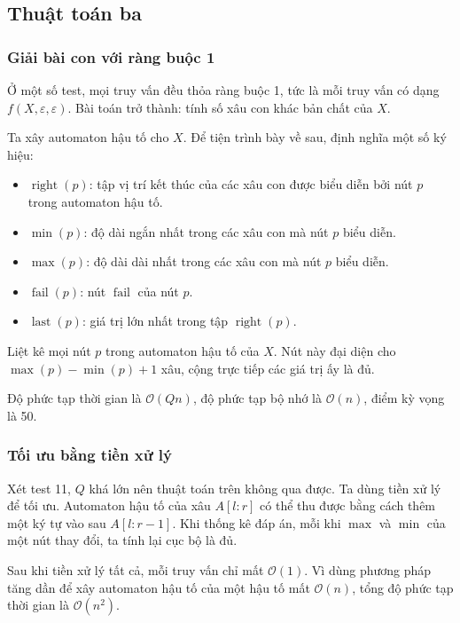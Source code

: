 \documentclass[11pt]{article}
\newcommand{\Oh}{\mathcal{O}}
\begin{document}
\subsection{Thuật toán ba}

\subsubsection{Giải bài con với ràng buộc 1}

Ở một số test, mọi truy vấn đều thỏa ràng buộc 1, tức là mỗi truy vấn có dạng
\(f(X,\varepsilon,\varepsilon)\). Bài toán trở thành: tính số xâu con khác bản
chất của \(X\).

Ta xây automaton hậu tố cho \(X\). Để tiện trình bày về sau, định nghĩa một số
ký hiệu:
\begin{itemize}
  \item \(\operatorname{right}(p)\): tập vị trí kết thúc của các xâu con được
  biểu diễn bởi nút \(p\) trong automaton hậu tố.
  \item \(\min(p)\): độ dài ngắn nhất trong các xâu con mà nút \(p\) biểu diễn.
  \item \(\max(p)\): độ dài dài nhất trong các xâu con mà nút \(p\) biểu diễn.
  \item \(\operatorname{fail}(p)\): nút \(\operatorname{fail}\) của nút \(p\).
  \item \(\operatorname{last}(p)\): giá trị lớn nhất trong tập
  \(\operatorname{right}(p)\).
\end{itemize}

Liệt kê mọi nút \(p\) trong automaton hậu tố của \(X\). Nút này đại diện cho
\(\max(p)-\min(p)+1\) xâu, cộng trực tiếp các giá trị ấy là đủ.

Độ phức tạp thời gian là \(\Oh(Qn)\), độ phức tạp bộ nhớ là \(\Oh(n)\), điểm
kỳ vọng là 50.

\subsubsection{Tối ưu bằng tiền xử lý}

Xét test 11, \(Q\) khá lớn nên thuật toán trên không qua được. Ta dùng tiền xử
lý để tối ưu. Automaton hậu tố của xâu \(A[l:r]\) có thể thu được bằng cách
thêm một ký tự vào sau \(A[l:r-1]\). Khi thống kê đáp án, mỗi khi \(\max\) và
\(\min\) của một nút thay đổi, ta tính lại cục bộ là đủ.

Sau khi tiền xử lý tất cả, mỗi truy vấn chỉ mất \(\Oh(1)\). Vì dùng phương
pháp tăng dần để xây automaton hậu tố của một hậu tố mất \(\Oh(n)\), tổng độ
phức tạp thời gian là \(\Oh(n^2)\).
\end{document}
